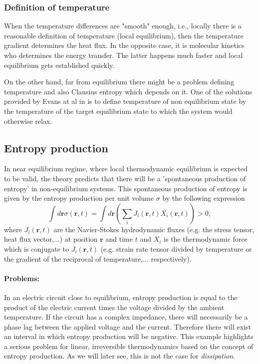 \documentclass[a4paper,12pt,nofootinbib]{article}
\begin{document}
\subsubsection{Definition of temperature}
When the temperature differences are "smooth" enough, i.e., locally there is a reasonable definition of temperature (local equilibrium), then the temperature gradient determines the heat flux. In the opposite case, it is molecular kinetics who determines the energy transfer. The latter happens much faster and local equilibrium gets established quickly.

On the other hand, far from equilibrium there might be a problem defining temperature and also Clausius entropy which depends on it. One of the solutions provided by Evans at al in  is to define temperature of non equilibrium state by the temperature of the target equilibrium state to which the system would otherwise relax.

\subsection{Entropy production}

In near equilibrium regime, where local thermodynamic equilibrium is expected to be valid, the theory predicts that there will be a 'spontaneous production of entropy' in non-equilibrium systems.
This spontaneous production of entropy is given by the entropy production per unit volume $\sigma$ by the following expression \cite{DeGroot:1984ue}
\begin{displaymath}
  \int d\bm{r} \sigma(\bm{r},t)=\int d\bm{r}(\sum_i J_i(\bm{r},t)X_i(\bm{r},t))>0,
\end{displaymath}
where $J_i(\bm{r},t)$ are the Navier-Stokes hydrodynamic fluxes (e.g. the stress tensor, heat flux vector,...) at position $\bm{r}$ and time $t$ and $X_i$ is the thermodynamic force which is conjugate to $J_i(\bm{r},t)$ (e.g. strain rate tensor divided by temperature or the gradient of the reciprocal of temperature,... respectively).

\paragraph{Problems:}
In an electric circuit close to equilibrium, entropy production is equal to the product of the electric current times the voltage divided by the ambient temperature. If the circuit has a complex impedance, there will necessarily be a phase lag between the applied voltage and the current. Therefore there will exist an interval in which entropy production will be negative. 
This example highlights a serious problem for linear, irreversible thermodynamics based on the concept of entropy production. As we will later see, this is not the case for \textit{dissipation}.
\end{document}

